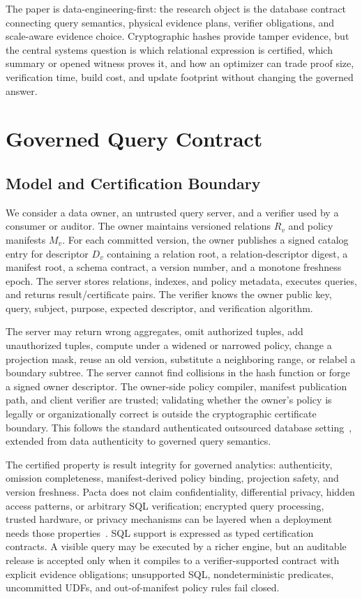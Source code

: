 \documentclass[conference]{IEEEtran}
\newcommand{\sys}{Pacta\xspace}
\begin{document}
The paper is data-engineering-first: the research object is the database contract connecting query semantics, physical evidence plans, verifier obligations, and scale-aware evidence choice. Cryptographic hashes provide tamper evidence, but the central systems question is which relational expression is certified, which summary or opened witness proves it, and how an optimizer can trade proof size, verification time, build cost, and update footprint without changing the governed answer.

\section{Governed Query Contract}
\subsection{Model and Certification Boundary}
We consider a data owner, an untrusted query server, and a verifier used by a consumer or auditor. The owner maintains versioned relations $R_v$ and policy manifests $M_v$. For each committed version, the owner publishes a signed catalog entry for descriptor $D_v$ containing a relation root, a relation-descriptor digest, a manifest root, a schema contract, a version number, and a monotone freshness epoch. The server stores relations, indexes, and policy metadata, executes queries, and returns result/certificate pairs. The verifier knows the owner public key, query, subject, purpose, expected descriptor, and verification algorithm.

The server may return wrong aggregates, omit authorized tuples, add unauthorized tuples, compute under a widened or narrowed policy, change a projection mask, reuse an old version, substitute a neighboring range, or relabel a boundary subtree. The server cannot find collisions in the hash function or forge a signed owner descriptor. The owner-side policy compiler, manifest publication path, and client verifier are trusted; validating whether the owner's policy is legally or organizationally correct is outside the cryptographic certificate boundary. This follows the standard authenticated outsourced database setting~\cite{hacigumus2002das,pang2004edge,sion2005assurance,li2006dynamic}, extended from data authenticity to governed query semantics.

The certified property is result integrity for governed analytics: authenticity, omission completeness, manifest-derived policy binding, projection safety, and version freshness. \sys does not claim confidentiality, differential privacy, hidden access patterns, or arbitrary SQL verification; encrypted query processing, trusted hardware, or privacy mechanisms can be layered when a deployment needs those properties~\cite{hacigumus2002encrypted,popa2011cryptdb,zheng2017opaque,dwork2006dp}. SQL support is expressed as typed certification contracts. A visible query may be executed by a richer engine, but an auditable release is accepted only when it compiles to a verifier-supported contract with explicit evidence obligations; unsupported SQL, nondeterministic predicates, uncommitted UDFs, and out-of-manifest policy rules fail closed.
\end{document}
